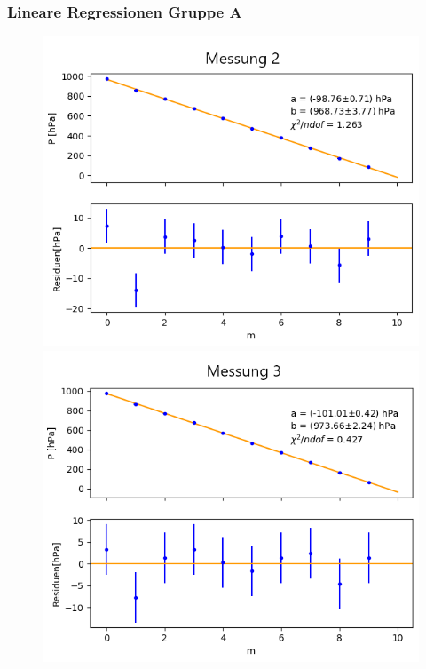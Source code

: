 \documentclass[12pt,a4paper]{article}
\begin{document}
\subsubsection{Lineare Regressionen Gruppe A}
\begin{figure}[h]
\centering
\includegraphics[scale=0.5]{Bilder/Druck_A_Var2_2.png}
\includegraphics[scale=0.5]{Bilder/Druck_A_Var2_3.png}

\end{figure}
\end{document}
